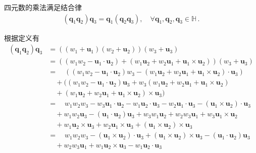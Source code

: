 \begin{proposition}
    四元数的乘法满足结合律
    \begin{align}
        ({\bm q}_1{\bm q}_2){\bm q}_3={\bm q}_1({\bm q}_2{\bm q}_3), \quad \forall {\bm q}_1, {\bm q}_2, {\bm q}_3\in \mathbb{H}\, .
    \end{align}
\end{proposition}
\begin{prove}
    根据定义有
    \begin{align}
        ({\bm q}_1{\bm q}_2){\bm q}_3 & =((w_1+{\bm u}_1)(w_2+{\bm u}_2))(w_3+{\bm u}_3)\nonumber                                                                                           \\
                                      & =((w_1w_2-{\bm u}_1\cdot{\bm u}_2)+(w_1{\bm u}_2+w_2{\bm u}_1+{\bm u}_1\times{\bm u}_2))(w_3+{\bm u}_3)\nonumber                                    \\
                                      & =\quad ((w_1w_2-{\bm u}_1\cdot{\bm u}_2)w_3-(w_1{\bm u}_2+w_2{\bm u}_1+{\bm u}_1\times{\bm u}_2)\cdot{\bm u}_3)\nonumber                            \\
                                      & \quad +((w_1w_2-{\bm u}_1\cdot{\bm u}_2){\bm u}_3+w_3(w_1{\bm u}_2+w_2{\bm u}_1+{\bm u}_1\times{\bm u}_2)\nonumber                                  \\
                                      & \quad +(w_1{\bm u}_2+w_2{\bm u}_1+{\bm u}_1\times{\bm u}_2)\times{\bm u}_3)\nonumber                                                                \\
                                      & =\quad w_1w_2w_3-w_3{\bm u}_1\cdot{\bm u}_2-w_1{\bm u}_2\cdot{\bm u}_3-w_2{\bm u}_1\cdot{\bm u}_3-({\bm u}_1\times{\bm u}_2)\cdot{\bm u}_3\nonumber \\
                                      & \quad +w_1w_2{\bm u}_3-({\bm u}_1\cdot{\bm u}_2){\bm u}_3+w_3w_1{\bm u}_2+w_2w_3{\bm u}_1+w_3{\bm u}_1\times{\bm u}_2\nonumber                      \\
                                      & \quad +w_1{\bm u}_2\times{\bm u}_3+w_2{\bm u}_1\times{\bm u}_3+({\bm u}_1\times{\bm u}_2)\times{\bm u}_3\nonumber                                   \\
                                      & =\quad  w_1w_2w_3-({\bm u}_1\times{\bm u}_2)\cdot{\bm u}_3+({\bm u}_1\times{\bm u}_2)\times{\bm u}_3-({\bm u}_1\cdot{\bm u}_2){\bm u}_3\nonumber    \\
                                      & \quad +w_2w_3{\bm u}_1+w_1{\bm u}_2\times{\bm u}_3-w_1{\bm u}_2\cdot{\bm u}_3\nonumber                                                              \\

\end{align}
\end{prove}
